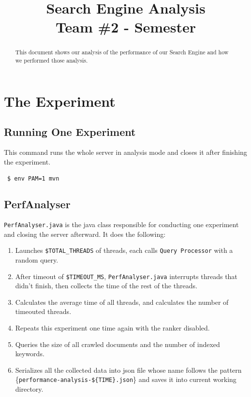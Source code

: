 \documentclass[12pt]{IEEEtran}
\title{\textbf{Search Engine Analysis}\\Team \#2 - Semester}
\date{}
\begin{document}

\maketitle


\begin{abstract}
  This document shows our analysis of the performance of our Search Engine and how we performed those analysis.
\end{abstract}

\section{The Experiment}
\subsection{Running One Experiment}
This command runs the whole server in analysis mode and closes it after finishing the experiment. 

~\texttt{\$ env PAM=1 mvn}

\subsection{PerfAnalyser}
\texttt{PerfAnalyser.java} is the java class responsible for conducting one experiment and closing the server afterward. 
It does the following:
\begin{enumerate}
  \item Launches \small\texttt{\$TOTAL\_THREADS} of threads, each calls \small\texttt{Query Processor} with a random query.
  \item After timeout of \small\texttt{\$TIMEOUT\_MS}, \small\texttt{PerfAnalyser.java} interrupts threads that didn't finish, then collects the time of the rest of the threads.
  \item Calculates the average time of all threads, and calculates the number of timeouted threads.
  \item Repeats this experiment one time again with the ranker disabled.
  \item Queries the size of all crawled documents and the number of indexed keywords.
  \item Serializes all the collected data into json file whose name follows the pattern \small\{\texttt{performance-analysis-\$\{TIME\}.json}\} and saves it into current working directory.
\end{enumerate}
\end{document}
